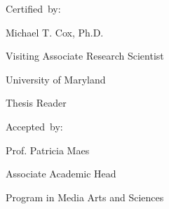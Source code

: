 \begin{addmargin}[-1cm]{-3cm}
\begin{flushright}
  \vspace{5mm}

  Certified~by:\hspace{0.5cm}~\makebox[2.75in]{\hrulefill}

                                 Michael T. Cox, Ph.D.

                                 Visiting Associate Research Scientist
                                 
                                 University of Maryland

                                 Thesis Reader

  \vspace{5mm}

  Accepted~by:\hspace{0.5cm}~\makebox[2.75in]{\hrulefill}

                                 Prof. Patricia Maes

                                 Associate Academic Head

                                 Program in Media Arts and Sciences
                                 
\end{flushright}

\end{addmargin}

